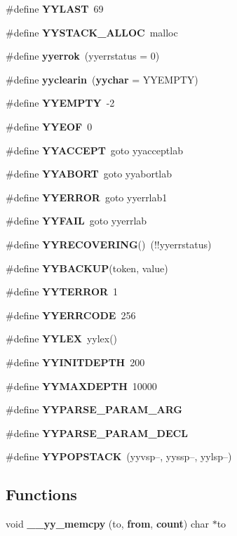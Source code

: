 \begin{CompactItemize}
\item 
\#define {\bf YYLAST}\ 69
\item 
\#define {\bf YYSTACK\_\-ALLOC}\ malloc
\item 
\#define {\bf yyerrok}\ (yyerrstatus = 0)
\item 
\#define {\bf yyclearin}\ ({\bf yychar} = YYEMPTY)
\item 
\#define {\bf YYEMPTY}\ -2
\item 
\#define {\bf YYEOF}\ 0
\item 
\#define {\bf YYACCEPT}\ goto yyacceptlab
\item 
\#define {\bf YYABORT}\ goto yyabortlab
\item 
\#define {\bf YYERROR}\ goto yyerrlab1
\item 
\#define {\bf YYFAIL}\ goto yyerrlab
\item 
\#define {\bf YYRECOVERING}()\ (!!yyerrstatus)
\item 
\#define {\bf YYBACKUP}(token, value)
\item 
\#define {\bf YYTERROR}\ 1
\item 
\#define {\bf YYERRCODE}\ 256
\item 
\#define {\bf YYLEX}\ yylex()
\item 
\#define {\bf YYINITDEPTH}\ 200
\item 
\#define {\bf YYMAXDEPTH}\ 10000
\item 
\#define {\bf YYPARSE\_\-PARAM\_\-ARG}
\item 
\#define {\bf YYPARSE\_\-PARAM\_\-DECL}
\item 
\#define {\bf YYPOPSTACK}\ (yyvsp--, yyssp--, yylsp--)
\end{CompactItemize}
\subsection*{Functions}
\begin{CompactItemize}
\item 
void {\bf \_\-\_\-yy\_\-memcpy} (to, {\bf from}, {\bf count}) char $\ast$to
\end{CompactItemize}
